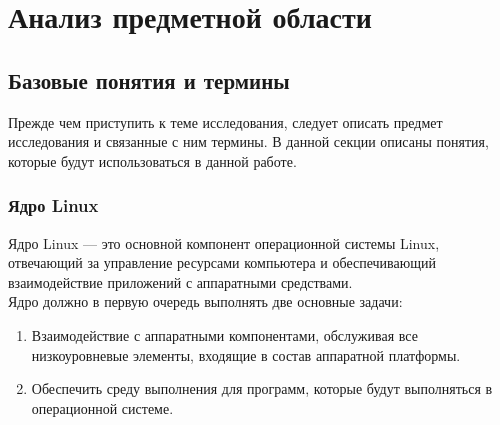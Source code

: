 \section{Анализ предметной области}

\subsection{Базовые понятия и термины}
Прежде чем приступить к теме исследования, следует описать предмет исследования и связанные с ним термины.
В данной секции описаны понятия, которые будут использоваться в данной работе.

\subsubsection{Ядро Linux}
Ядро Linux — это основной компонент операционной системы Linux, отвечающий за управление ресурсами компьютера и обеспечивающий взаимодействие приложений с аппаратными средствами.\\
Ядро должно в первую очередь выполнять две основные задачи:
\begin{enumerate}
    \item Взаимодействие с аппаратными компонентами, обслуживая все низкоуровневые элементы, входящие в состав аппаратной платформы.
    \item Обеспечить среду выполнения для программ, которые будут выполняться в операционной системе.
\end{enumerate}

